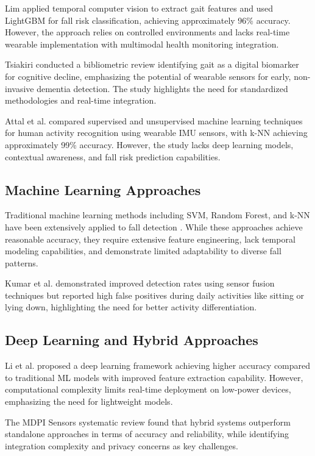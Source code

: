 \documentclass[conference]{IEEEtran}
\begin{document}
Lim \cite{lim2024} applied temporal computer vision to extract gait features and used LightGBM for fall risk classification, achieving approximately 96\% accuracy. However, the approach relies on controlled environments and lacks real-time wearable implementation with multimodal health monitoring integration.

Tsiakiri \cite{tsiakiri2025} conducted a bibliometric review identifying gait as a digital biomarker for cognitive decline, emphasizing the potential of wearable sensors for early, non-invasive dementia detection. The study highlights the need for standardized methodologies and real-time integration.

Attal et al. \cite{attal2015} compared supervised and unsupervised machine learning techniques for human activity recognition using wearable IMU sensors, with k-NN achieving approximately 99\% accuracy. However, the study lacks deep learning models, contextual awareness, and fall risk prediction capabilities.

\subsection{Machine Learning Approaches}

Traditional machine learning methods including SVM, Random Forest, and k-NN have been extensively applied to fall detection \cite{acm2024, huang2024}. While these approaches achieve reasonable accuracy, they require extensive feature engineering, lack temporal modeling capabilities, and demonstrate limited adaptability to diverse fall patterns.

Kumar et al. \cite{kumar2024sensor} demonstrated improved detection rates using sensor fusion techniques but reported high false positives during daily activities like sitting or lying down, highlighting the need for better activity differentiation.

\subsection{Deep Learning and Hybrid Approaches}

Li et al. \cite{li2024} proposed a deep learning framework achieving higher accuracy compared to traditional ML models with improved feature extraction capability. However, computational complexity limits real-time deployment on low-power devices, emphasizing the need for lightweight models.

The MDPI Sensors systematic review \cite{mdpi2025} found that hybrid systems outperform standalone approaches in terms of accuracy and reliability, while identifying integration complexity and privacy concerns as key challenges.
\end{document}
